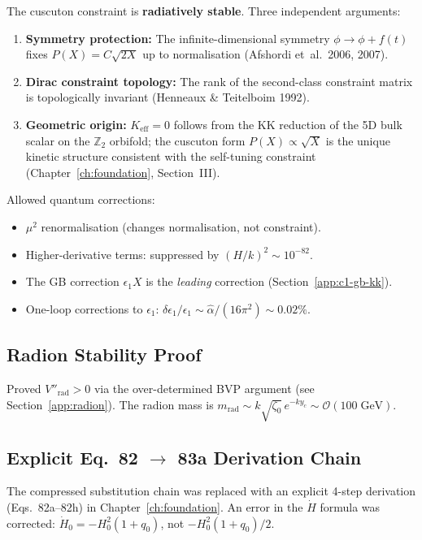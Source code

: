 The cuscuton constraint is \textbf{radiatively stable}. Three independent arguments:
\begin{enumerate}
\item \textbf{Symmetry protection:} The infinite-dimensional symmetry $\phi \to \phi + f(t)$ fixes $P(X) = C\sqrt{2X}$ up to normalisation (Afshordi et~al.\ 2006, 2007).
\item \textbf{Dirac constraint topology:} The rank of the second-class constraint matrix is topologically invariant (Henneaux \& Teitelboim 1992).
\item \textbf{Geometric origin:} $K_{\mathrm{eff}} = 0$ follows from the KK reduction of the 5D bulk scalar on the $\mathbb{Z}_2$ orbifold; the cuscuton form $P(X) \propto \sqrt{X}$ is the unique kinetic structure consistent with the self-tuning constraint (Chapter~\ref{ch:foundation}, Section~III).
\end{enumerate}

Allowed quantum corrections:
\begin{itemize}
\item $\mu^2$ renormalisation (changes normalisation, not constraint).
\item Higher-derivative terms: suppressed by $(H/k)^2 \sim 10^{-82}$.
\item The GB correction $\epsilon_1 X$ is the \emph{leading} correction (Section~\ref{app:c1-gb-kk}).
\item One-loop corrections to $\epsilon_1$: $\delta\epsilon_1/\epsilon_1 \sim \hat{\alpha}/(16\pi^2) \sim 0.02\%$.
\end{itemize}

\subsection{Radion Stability Proof}

Proved $V''_{\mathrm{rad}} > 0$ via the over-determined BVP argument (see Section~\ref{app:radion}). The radion mass is $m_{\mathrm{rad}} \sim k\sqrt{\zeta_0}\,e^{-ky_c} \sim \mathcal{O}(100\;\mathrm{GeV})$.

\subsection{Explicit Eq.~82 $\to$ 83a Derivation Chain}

The compressed substitution chain was replaced with an explicit 4-step derivation (Eqs.~82a--82h) in Chapter~\ref{ch:foundation}. An error in the $\dot{H}$ formula was corrected: $\dot{H}_0 = -H_0^2(1+q_0)$, not $-H_0^2(1+q_0)/2$.

